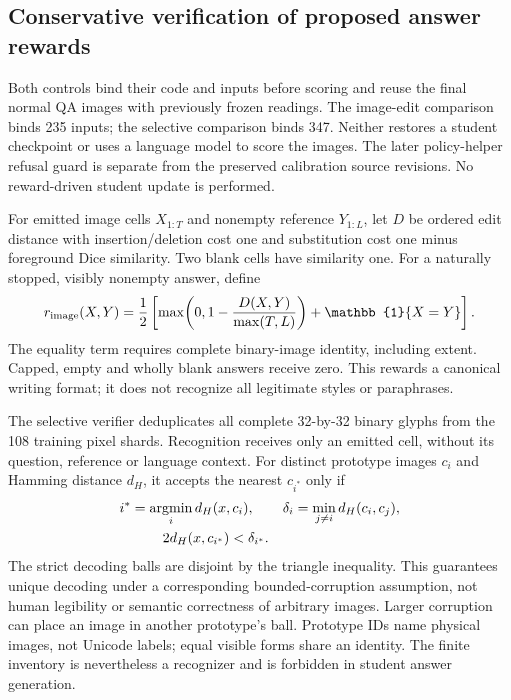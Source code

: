 \documentclass[12pt,a4paper]{article}
\providecommand{\DIFadd}[1]{{\protect\color{blue} \sf #1}} %
\begin{document}
\subsection*{\DIFadd{Conservative verification of proposed answer rewards}}

\DIFadd{Both controls bind their code and inputs before scoring and reuse the final
normal QA images with previously frozen readings. The image-edit comparison
binds 235 inputs; the selective comparison binds 347. Neither restores a
student checkpoint or uses a language model to score the images. The later
policy-helper refusal guard is separate from the preserved calibration source
revisions. No reward-driven student update is performed.
}

\DIFadd{For emitted image cells $X_{1:T}$ and nonempty reference $Y_{1:L}$, let $D$ be
ordered edit distance with insertion/deletion cost one and substitution cost
one minus foreground Dice similarity. Two blank cells have similarity one.
For a naturally stopped, visibly nonempty answer, define
}\begin{equation}
 r_{\rm image}(X,Y)=\frac{1}{2}\left[
 \max\!\left(0,1-\frac{D(X,Y)}{\max(T,L)}\right)
 +\mathbb{1}\{X=Y\}\right].
 \label{eq:answer-image-reward}
\end{equation}
\DIFadd{The equality term requires complete binary-image identity, including extent.
Capped, empty and wholly blank answers receive zero. This rewards a canonical
writing format; it does not recognize all legitimate styles or paraphrases.
}

\DIFadd{The selective verifier deduplicates all complete 32-by-32 binary glyphs from
the 108 training pixel shards. Recognition receives only an emitted cell,
without its question, reference or language context. For distinct prototype
images $c_i$ and Hamming distance $d_H$, it accepts the nearest $c_{i^*}$ only if
}\begin{equation}
 \begin{aligned}
 i^*&=\mathop{\rm argmin}_i d_H(x,c_i),\qquad
 \delta_i=\min_{j\ne i}d_H(c_i,c_j),\\
 &\hspace{8mm}2d_H(x,c_{i^*})<\delta_{i^*}.
 \end{aligned}
 \label{eq:selective-glyph-verification}
\end{equation}
\DIFadd{The strict decoding balls are disjoint by the triangle inequality. This
guarantees unique decoding under a corresponding bounded-corruption assumption,
not human legibility or semantic correctness of arbitrary images. Larger
corruption can place an image in another prototype's ball. Prototype IDs name
physical images, not Unicode labels; equal visible forms share an identity.
The finite inventory is nevertheless a recognizer and is forbidden in student
answer generation.
}
\end{document}
